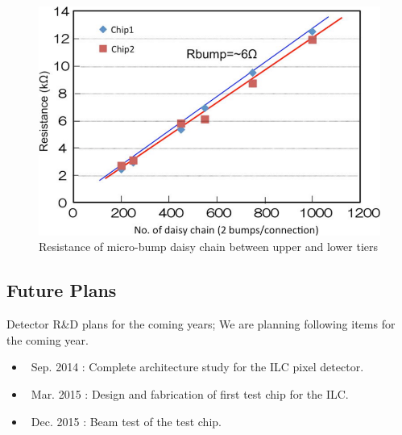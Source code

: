 \begin{figure}
\centering
\includegraphics[width=.5\textwidth]{VertexDetector/SOI/resistanceOfDaisyChain}
\caption{Resistance of micro-bump daisy chain between upper and lower tiers}
\label{fig:VertexDetector:SOI:resistanceOfDaisyChain}
\end{figure}

\subsection{Future Plans}
Detector R\&D plans for the coming years;
We are planning following items for the coming year.
\begin{itemize}
\item ~Sep. 2014 : Complete architecture study for the ILC pixel detector.
\item ~Mar. 2015 : Design and fabrication of first test chip for the ILC.
\item ~Dec. 2015 : Beam test of the test chip.
\end{itemize}
